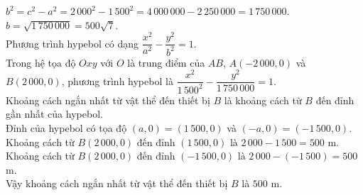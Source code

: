 \begin{bt}
{{}\noindent
		$b^2 = c^2 - a^2 = 2\,000^2 - 1\,500^2 = 4\,000\,000 - 2\,250\,000 = 1\,750\,000$.\\
		$b = \sqrt{1\,750\,000} = 500\sqrt{7}$.\\
		Phương trình hypebol có dạng $\dfrac{x^2}{a^2} - \dfrac{y^2}{b^2} = 1$.\\
		Trong hệ tọa độ $Oxy$ với $O$ là trung điểm của $AB$, $A(-2\,000, 0)$ và $B(2\,000, 0)$, phương trình hypebol là $\dfrac{x^2}{1\,500^2} - \dfrac{y^2}{1\,750\,000} = 1$.\\
		Khoảng cách ngắn nhất từ vật thể đến thiết bị $B$ là khoảng cách từ $B$ đến đỉnh gần nhất của hypebol.\\
		Đỉnh của hypebol có tọa độ $(a, 0) = (1\,500, 0)$ và $(-a, 0) = (-1\,500, 0)$.\\
		Khoảng cách từ $B(2\,000, 0)$ đến đỉnh $(1\,500, 0)$ là $2\,000 - 1\,500 = 500$ m.\\
		Khoảng cách từ $B(2\,000, 0)$ đến đỉnh $(-1\,500, 0)$ là $2\,000 - (-1\,500) = 500$ m.\\
		Vậy khoảng cách ngắn nhất từ vật thể đến thiết bị $B$ là $500$ m.
		
	}
\end{bt}

